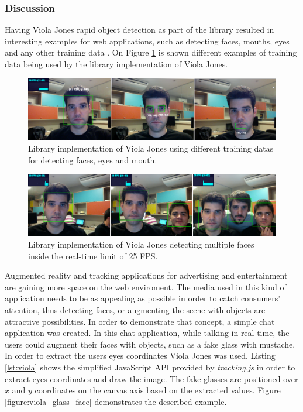 \subsubsection{Discussion} %
\label{subsub:evaluation:results:rapid_object_detection:discussion}

Having Viola Jones rapid object detection as part of the library resulted in interesting examples for web applications, such as detecting faces, mouths, eyes and any other training data \cite{Viola2001}. On Figure \ref{figure:viola_overview} is shown different examples of training data being used by the library implementation of Viola Jones.

\begin{figure}[!htb]
  \centering
  \includegraphics[width=\linewidth]{chapters/evaluation/viola_overview.png}
  \caption{Library implementation of Viola Jones using different training datas for detecting faces, eyes and mouth.}
  \label{figure:viola_overview}
\end{figure}

\begin{figure}[!htb]
  \centering
  \includegraphics[width=\linewidth]{chapters/evaluation/viola.png}
  \caption{Library implementation of Viola Jones detecting multiple faces inside the real-time limit of 25 FPS.}
  \label{figure:viola_multiple_faces}
\end{figure}

Augmented reality and tracking applications for advertising and entertainment are gaining more space on the web enviroment. The media used in this kind of application needs to be as appealing as possible in order to catch consumers' attention, thus detecting faces, or augmenting the scene with objects are attractive possibilities. In order to demonstrate that concept, a simple chat application was created. In this chat application, while talking in real-time, the users could augment their faces with objects, such as a fake glass with mustache. In order to extract the users eyes coordinates Viola Jones was used. Listing \ref{lst:viola} shows the simplified JavaScript API provided by \textit{tracking.js} in order to extract eyes coordinates and draw the image. The fake glasses are positioned over $x$ and $y$ coordinates on the canvas axis based on the extracted values. Figure \ref{figure:viola_glass_face} demonstrates the described example.

